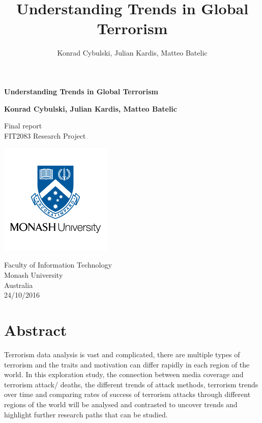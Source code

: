 \documentclass[10pt,a4paper]{article}
\author{Konrad Cybulski, Julian Kardis, Matteo Batelic}
\title{Understanding Trends in Global Terrorism}
\begin{document}
\begin{titlepage}
    \begin{center}
        \vspace*{1cm}
        
        \LARGE
        \textbf{Understanding Trends in Global Terrorism}
        
        \vspace{4cm}
        
		\Large 
        
        \textbf{Konrad Cybulski, Julian Kardis, Matteo Batelic}
        
        
        \LARGE
        \vspace{2cm}

        
        
        \vfill
        
        
        
        Final report \\
        FIT2083 Research Project
        
        
        \includegraphics[width=0.4\textwidth]{monash-university-logo.png}
              
        
        \large
        Faculty of Information Technology\\
        Monash University\\
        Australia\\
        24/10/2016
        
    \end{center}
\end{titlepage}

\pagebreak
\tableofcontents
\pagebreak

\section{Abstract} 
Terrorism data analysis is vast and complicated, there are multiple  types of terrorism and the traits and motivation can differ rapidly in each region of the world. In this exploration study, the connection between media coverage and terrorism attack/ deaths, the different trends of attack methods, terrorism trends over time and comparing rates of success of terrorism attacks through different regions of the world will be analysed and contrasted to uncover trends and highlight further research paths that can be studied.  
\end{document}

